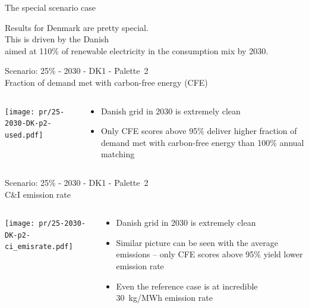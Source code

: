 

\begin{frame}{The special scenario case}
\centering

Results for Denmark are pretty special. \\
This is driven by the Danish  \\ 
aimed at 110\% of renewable electricity in the consumption mix by 2030.

\end{frame}


\begin{frame}{Scenario: 25\% - 2030 - DK1 - Palette~2
\\ Fraction of demand met with carbon-free energy (CFE)}

\begin{columns}[T]
\begin{column}{9cm}
\centering

\texttt{[image: pr/25-2030-DK-p2-used.pdf]}
\end{column}
\begin{column}{5cm}

\begin{itemize}
  \item Danish grid in 2030 is \alert{extremely clean}
  \item Only \alert{CFE scores above 95\%} deliver higher fraction of demand met with carbon-free energy than 100\% annual matching
\end{itemize}
  
\end{column}
\end{columns}

\end{frame}


\begin{frame}{Scenario: 25\% - 2030 - DK1 - Palette~2 \\ 
C\&I emission rate}

\begin{columns}[T]
\begin{column}{9cm}
\centering

\texttt{[image: pr/25-2030-DK-p2-ci\_emisrate.pdf]}
\end{column}
\begin{column}{5cm}

\begin{itemize}
  \item Danish grid in 2030 is \alert{extremely clean}
  \item Similar picture can be seen with the average emissions -- only \alert{CFE scores above 95\%} yield lower emission rate
  \item Even the reference case is at incredible 30~kg/MWh emission rate
\end{itemize}
  
\end{column}
\end{columns}

\end{frame}


